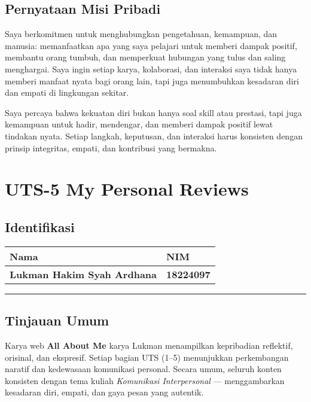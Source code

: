 \documentclass[
  letterpaper,
  DIV=11,
  numbers=noendperiod]{scrreprt}
\begin{document}
\section{Pernyataan Misi Pribadi}\label{pernyataan-misi-pribadi}

Saya berkomitmen untuk menghubungkan pengetahuan, kemampuan, dan
manusia: memanfaatkan apa yang saya pelajari untuk memberi dampak
positif, membantu orang tumbuh, dan memperkuat hubungan yang tulus dan
saling menghargai. Saya ingin setiap karya, kolaborasi, dan interaksi
saya tidak hanya memberi manfaat nyata bagi orang lain, tapi juga
menumbuhkan kesadaran diri dan empati di lingkungan sekitar.

Saya percaya bahwa kekuatan diri bukan hanya soal skill atau prestasi,
tapi juga kemampuan untuk hadir, mendengar, dan memberi dampak positif
lewat tindakan nyata. Setiap langkah, keputusan, dan interaksi harus
konsisten dengan prinsip integritas, empati, dan kontribusi yang
bermakna.


\chapter{UTS-5 My Personal Reviews}\label{uts-5-my-personal-reviews}

\section{Identifikasi}\label{identifikasi}

\begin{longtable}[]{@{}ll@{}}
\toprule\noalign{}
Nama & NIM \\
\midrule\noalign{}
\endhead
\bottomrule\noalign{}
\endlastfoot
\textbf{Lukman Hakim Syah Ardhana} & \textbf{18224097} \\
\end{longtable}

\begin{center}\rule{0.5\linewidth}{0.5pt}\end{center}

\section{Tinjauan Umum}\label{tinjauan-umum}

Karya web \textbf{All About Me} karya Lukman menampilkan kepribadian
reflektif, orisinal, dan ekspresif. Setiap bagian UTS (1--5) menunjukkan
perkembangan naratif dan kedewasaan komunikasi personal. Secara umum,
seluruh konten konsisten dengan tema kuliah \emph{Komunikasi
Interpersonal} --- menggambarkan kesadaran diri, empati, dan gaya pesan
yang autentik.
\end{document}
